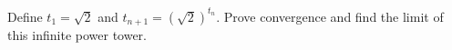 Define $t_1=\sqrt2$ and $t_{n+1}=(\sqrt2)^{t_n}$. Prove convergence and find the limit of this infinite power tower.
